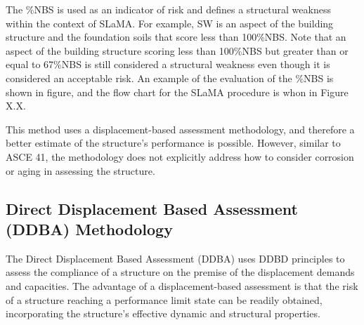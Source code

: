 The \%NBS is used as an indicator of risk and defines a structural weakness within the context of SLaMA. For example, SW is an aspect of the building structure and the foundation soils that score less than 100\%NBS. Note that an aspect of the building structure scoring less than 100\%NBS but greater than or equal to 67\%NBS is still considered a structural weakness even though it is considered an acceptable risk. An example of the evaluation of the \%NBS is shown in figure, and the flow chart for the SLaMA procedure is whon in Figure X.X.

This method uses a displacement-based assessment methodology, and therefore a better estimate of the structure's performance is possible. However, similar to ASCE 41, the methodology does not explicitly address how to consider corrosion or aging in assessing the structure.

\subsection{Direct Displacement Based Assessment (DDBA) Methodology}

The Direct Displacement Based Assessment (DDBA) uses DDBD principles to assess the compliance of a structure on the premise of the displacement demands and capacities. The advantage of a displacement-based assessment is that the risk of a structure reaching a performance limit state can be readily obtained, incorporating the structure's effective dynamic and structural properties. 

